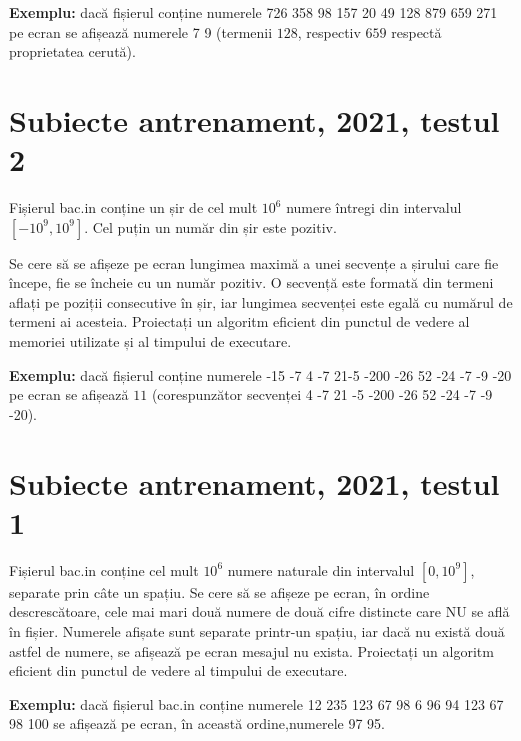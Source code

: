 \documentclass[10pt, a4paper]{article}
\newcommand{\highlight}[1]{{\ttfamily\color{red}#1}}
\begin{document}
\vspace{0.2cm}
\noindent \textbf{Exemplu:} dacă fișierul conține numerele \highlight{726 358 98 157 20 49 128 879 659 271} pe ecran se afișează numerele \highlight{7 9} (termenii \highlight{$128$}, respectiv \highlight{$659$} respectă proprietatea cerută).

\section{Subiecte antrenament, 2021, testul 2}
Fișierul \highlight{bac.in} conține un șir de cel mult \highlight{$10^6$} numere întregi din intervalul \highlight{$[-10^9,10^9]$}. Cel puțin un număr din șir este pozitiv.

\vspace{0.2cm}
\noindent Se cere să se afișeze pe ecran lungimea maximă a unei secvențe a șirului care fie începe, fie se încheie cu un număr pozitiv. O secvență este formată din termeni aflați pe poziții consecutive în șir, iar lungimea secvenței este egală cu numărul de termeni ai acesteia. Proiectați un algoritm eficient din punctul de vedere al memoriei utilizate și al timpului de executare.

\vspace{0.2cm}
\noindent \textbf{Exemplu:} dacă fișierul conține numerele \highlight{-15 -7 4 -7 21-5 -200 -26 52 -24 -7 -9 -20} pe ecran se afișează \highlight{$11$} (corespunzător secvenței \highlight{4 -7 21 -5 -200 -26 52 -24 -7 -9 -20}).

\section{Subiecte antrenament, 2021, testul 1}
Fișierul \highlight{bac.in} conține cel mult \highlight{$10^6$} numere naturale din intervalul \highlight{$[0,10^9]$}, separate prin câte un spațiu. Se cere să se afișeze pe ecran, în ordine descrescătoare, cele mai mari două numere de două cifre distincte care NU se află în fișier. Numerele afișate sunt separate printr-un spațiu, iar dacă nu există două astfel de numere, se afișează pe ecran mesajul \highlight{nu exista}. Proiectați un algoritm eficient din punctul de vedere al timpului de executare.

\vspace{0.2cm}
\noindent \textbf{Exemplu:} dacă fișierul \highlight{bac.in} conține numerele \highlight{12 235 123 67 98 6 96 94 123 67 98 100} se afișează pe ecran, în această ordine,numerele \highlight{97 95}.
\end{document}
